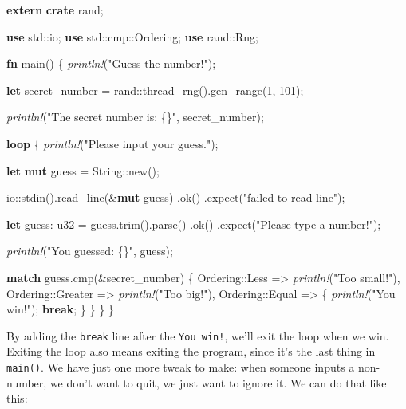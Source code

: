 \documentclass[a4paper,]{book}
\newenvironment{Shaded}{\begin{snugshade}}{\end{snugshade}}
\newcommand{\KeywordTok}[1]{\textcolor[rgb]{0.13,0.29,0.53}{\textbf{{#1}}}}
\newcommand{\DataTypeTok}[1]{\textcolor[rgb]{0.13,0.29,0.53}{{#1}}}
\newcommand{\DecValTok}[1]{\textcolor[rgb]{0.00,0.00,0.81}{{#1}}}
\newcommand{\StringTok}[1]{\textcolor[rgb]{0.31,0.60,0.02}{{#1}}}
\newcommand{\PreprocessorTok}[1]{\textcolor[rgb]{0.56,0.35,0.01}{\textit{{#1}}}}
\newcommand{\NormalTok}[1]{{#1}}
\begin{document}
\begin{Shaded}
\begin{Highlighting}[]
\KeywordTok{extern} \KeywordTok{crate} \NormalTok{rand;}

\KeywordTok{use} \NormalTok{std::io;}
\KeywordTok{use} \NormalTok{std::cmp::Ordering;}
\KeywordTok{use} \NormalTok{rand::Rng;}

\KeywordTok{fn} \NormalTok{main() \{}
    \PreprocessorTok{println!}\NormalTok{(}\StringTok{"Guess the number!"}\NormalTok{);}

    \KeywordTok{let} \NormalTok{secret_number = rand::thread_rng().gen_range(}\DecValTok{1}\NormalTok{, }\DecValTok{101}\NormalTok{);}

    \PreprocessorTok{println!}\NormalTok{(}\StringTok{"The secret number is: \{\}"}\NormalTok{, secret_number);}

    \KeywordTok{loop} \NormalTok{\{}
        \PreprocessorTok{println!}\NormalTok{(}\StringTok{"Please input your guess."}\NormalTok{);}

        \KeywordTok{let} \KeywordTok{mut} \NormalTok{guess = }\DataTypeTok{String}\NormalTok{::new();}

        \NormalTok{io::stdin().read_line(&}\KeywordTok{mut} \NormalTok{guess)}
            \NormalTok{.ok()}
            \NormalTok{.expect(}\StringTok{"failed to read line"}\NormalTok{);}

        \KeywordTok{let} \NormalTok{guess: }\DataTypeTok{u32} \NormalTok{= guess.trim().parse()}
            \NormalTok{.ok()}
            \NormalTok{.expect(}\StringTok{"Please type a number!"}\NormalTok{);}

        \PreprocessorTok{println!}\NormalTok{(}\StringTok{"You guessed: \{\}"}\NormalTok{, guess);}

        \KeywordTok{match} \NormalTok{guess.cmp(&secret_number) \{}
            \NormalTok{Ordering::Less    => }\PreprocessorTok{println!}\NormalTok{(}\StringTok{"Too small!"}\NormalTok{),}
            \NormalTok{Ordering::Greater => }\PreprocessorTok{println!}\NormalTok{(}\StringTok{"Too big!"}\NormalTok{),}
            \NormalTok{Ordering::Equal   => \{}
                \PreprocessorTok{println!}\NormalTok{(}\StringTok{"You win!"}\NormalTok{);}
                \KeywordTok{break}\NormalTok{;}
            \NormalTok{\}}
        \NormalTok{\}}
    \NormalTok{\}}
\NormalTok{\}}
\end{Highlighting}
\end{Shaded}

By adding the \texttt{break} line after the \texttt{You\ win!}, we'll
exit the loop when we win. Exiting the loop also means exiting the
program, since it's the last thing in \texttt{main()}. We have just one
more tweak to make: when someone inputs a non-number, we don't want to
quit, we just want to ignore it. We can do that like this:
\end{document}
